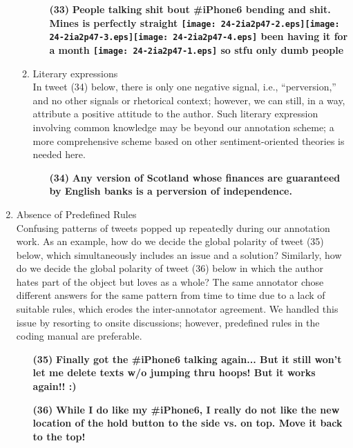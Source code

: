 \documentclass[english]{jnlp_1.4}
\begin{document}
\begin{enumerate}
\begin{enumerate}
\begin{enumerate}
\item[{\bf (33)}] {\bf People talking shit bout \#iPhone6 bending and shit. Mines is perfectly straight \texttt{[image: 24-2ia2p47-2.eps]}\texttt{[image: 24-2ia2p47-3.eps]}\texttt{[image: 24-2ia2p47-4.eps]} been having it for a month  \texttt{[image: 24-2ia2p47-1.eps]} so stfu only dumb people}
\end{enumerate}
\item Literary expressions\\
In tweet (34) below, there is only one negative signal, i.e., ``perversion,'' and no other signals or rhetorical context; however, we can still, in a way, attribute a positive attitude to the author. Such literary expression involving common knowledge may be beyond our annotation scheme; a more comprehensive scheme based on other sentiment-oriented theories is needed here.
\begin{enumerate}
\item[{\bf (34)}] {\bf Any version of Scotland whose finances are guaranteed by English banks is a perversion of independence.}
\end{enumerate}
\end{enumerate}
\item Absence of Predefined Rules\\
Confusing patterns of tweets popped up repeatedly during our annotation work. As an example, how do we decide the global polarity of tweet (35) below, which simultaneously includes an issue and a solution? Similarly, how do we decide the global polarity of tweet (36) below in which the author hates part of the object but loves as a whole? The same annotator chose different answers for the same pattern from time to time due to a lack of suitable rules, which erodes the inter-annotator agreement. We handled this issue by resorting to onsite discussions; however, predefined rules in the coding manual are preferable.
\begin{enumerate}
\item[{\bf (35)}] {\bf Finally got the \#iPhone6 talking again... But it still won't let me delete texts w/o jumping thru hoops! But it works again!! :)}
\item[{\bf (36)}] {\bf While I do like my \#iPhone6, I really do not like the new location of the hold button to the side vs. on top. Move it back to the top!}
\end{enumerate}
\end{enumerate}
\end{document}
